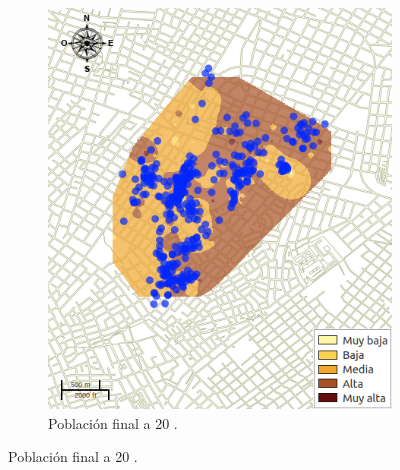 \begin{figure}[!t]
\begin{subfigure}[b]{0.225\textwidth}
        \includegraphics[width=\textwidth]{../book/capitulo-6/graphics/raster/temp-24-49.png}
        \caption{ Población final a 20 \textcelsius.}
    \end{subfigure}


\end{figure}
